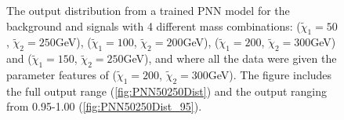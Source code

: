 \begin{figure}
    \caption{The output distribution from a trained \ac{PNN} model for the background and signals with 4 different mass combinations:
    ($\tilde{\chi}_1=50$, $\tilde{\chi}_2=250$GeV), ($\tilde{\chi}_1=100$, $\tilde{\chi}_2=200$GeV), 
    ($\tilde{\chi}_1=200$, $\tilde{\chi}_2=300$GeV) and ($\tilde{\chi}_1=150$, $\tilde{\chi}_2=250$GeV), and where all the data were given the 
    parameter features of ($\tilde{\chi}_1=200$, $\tilde{\chi}_2=300$GeV). The figure includes the full output range (\ref{fig:PNN50250Dist}) 
    and the output ranging from 0.95-1.00 (\ref{fig:PNN50250Dist_95}).}
    \label{fig:PNN200300Dist}
\end{figure}

